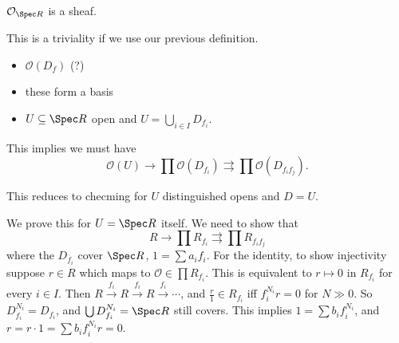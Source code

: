 \begin{definition}[]
    $\mathcal{O} _{\Spec R}$ is a sheaf.
\end{definition}
This is a triviality if we use our previous definition. 
\begin{itemize}
\setlength\itemsep{-.2em}
    \item $\mathcal{O} (D_f)$ (?)
    \item these form a basis
    \item $U \subseteq \Spec R $ open and $U= \bigcup_{i \in  I} D_{f_i }$. 
\end{itemize}
This implies we must have \[
    \mathcal{O} (U) \to \prod \mathcal{O} (D_{f_i }) \rightrightarrows \prod \mathcal{O} (D_{f_i f_j }).
\] 
\begin{claim}
    This reduces to checming for $U$ distinguished opens and $D=U$.
\end{claim}
We prove this for $U=\Spec R$ itself. We need to show that \[
R \to \prod R_{f_i }\rightrightarrows \prod R_{f_i f_j }
\] where the $D_{f_i }$ cover $\Spec R$, $1=\sum a_i  f_i $. For the identity, to show injectivity suppose $r \in R$ which maps to $\mathcal{O}  \in \prod R_{f_i }$. This is equivalent to $r \mapsto 0$ in $R_{f_i }$ for every $i \in I$. Then $R \xrightarrow{f_i } R \xrightarrow{f_i }R \xrightarrow{f_i }\cdots $, and $\frac{r}{1}\in  R_{f_i }$ iff $f_i  ^{N_i }r=0$ for $N \gg 0$. So $D_{f_i }^{N_i }=D_{f_i }$, and $\bigcup D_{f_i }^{N_i }=\Spec R$ still covers. This implies $1=\sum b_i  f_i  ^{N_i }$, and $r= r\cdot 1= \sum b_i  f_i ^{N_i }r=0$.

